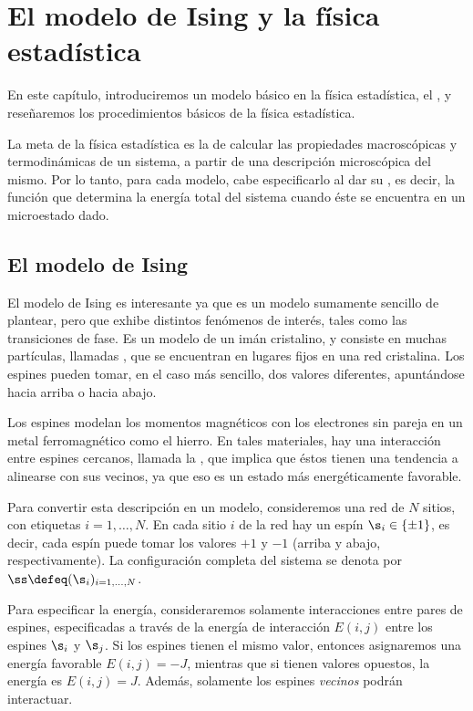 \chapter{El modelo de Ising y la física estadística}
En este capítulo, introduciremos un modelo básico en la física estadística, el
, y reseñaremos los procedimientos básicos de la física
estadística.  

La meta de la física estadística es la de calcular las propiedades
macroscópicas y termodinámicas de un sistema, a partir de una descripción
microscópica del mismo.  Por lo tanto, para cada modelo, cabe especificarlo al
dar su , es decir, la función que determina la energía total
del sistema cuando éste se encuentra en un microestado dado.

\section{El modelo de Ising}
El modelo de Ising es interesante ya que es un modelo sumamente
sencillo de plantear, pero que exhibe distintos fenómenos de interés, tales
como las transiciones de fase.  Es un modelo de un imán cristalino, y consiste
en muchas partículas, llamadas , que se encuentran en lugares
fijos en una red cristalina. Los espines pueden tomar, en el caso más sencillo,
dos valores diferentes, apuntándose hacia arriba o hacia abajo.  

Los espines
modelan los momentos magnéticos con los electrones sin pareja en un metal
ferromagnético como el hierro. En tales materiales, hay una interacción entre
espines cercanos, llamada la , que implica que
éstos tienen una tendencia a alinearse con sus vecinos, ya que eso es un estado
más energéticamente favorable.

Para convertir esta descripción en un modelo, consideremos una red de $N$
sitios, con etiquetas $i=1, \ldots, N$. En cada sitio $i$ de la red hay un
espín $\s_i \in \{\pm1\}$, es decir, cada espín puede tomar los valores $+1$ y
$-1$ (arriba y abajo, respectivamente).  La configuración completa del sistema
se denota por $\ss \defeq (\s_i)_{i=1,\ldots,N}$.

Para especificar la energía, consideraremos solamente interacciones entre pares
de espines, especificadas a través de la energía de interacción $E(i,j)$ entre
los espines $\s_i$ y $\s_j$.  Si los espines tienen el mismo valor, entonces
asignaremos una energía favorable $E(i,j) = -J$, mientras que si tienen valores
opuestos, la energía es $E(i,j) = J$. Además, solamente los espines
\emph{vecinos} podrán interactuar. 

